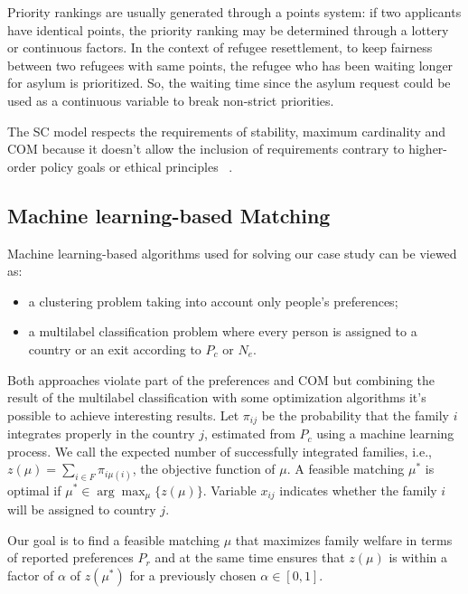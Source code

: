 Priority rankings are usually generated through a points system: if two applicants have identical points, the priority ranking may be determined through a lottery or continuous factors. In the context of refugee resettlement, to keep fairness between two refugees with same points, the refugee who has been waiting longer for asylum is prioritized. So, the waiting time since the asylum request could be used as a continuous variable to break non-strict priorities.

The SC model respects the requirements of stability, maximum cardinality and COM because it doesn't allow the inclusion of requirements contrary to higher-order policy goals or ethical principles ~\cite{basshuysen}.


\subsection{Machine learning-based Matching}\label{machine-learning-based-matching}%

Machine learning-based algorithms used for solving our case study can be viewed as:

\begin{itemize}
    \item a clustering problem taking into account only people's preferences;
    \item a multilabel classification problem where every person is assigned to a country or an exit according to \(P_c\) or \(N_e\).
\end{itemize}
Both approaches violate part of the preferences and COM but combining the result of the multilabel classification with some optimization algorithms it's possible to achieve interesting results. Let \(\pi_{ij}\) be the probability that the family \(i\) integrates properly in the country \(j\), estimated from \(P_c\) using a machine learning process. We call the expected number of successfully integrated families, i.e., \(z (\mu) = \sum_{i \in F} \pi_{i \mu (i)}\), the objective function of \(\mu\). A feasible matching \(\mu^*\) is optimal if \(\mu^* \in \arg\max_{\mu} \{z (\mu)\}\). Variable \(x_{ij}\) indicates whether the family \(i\) will be assigned to country \(j\).

Our goal is to find a feasible matching \(\mu\) that maximizes family welfare in terms of reported preferences \(P_r\) and at the same time ensures that \(z (\mu)\) is within a factor of \(\alpha\) of \(z \left( \mu^* \right)\) for a previously chosen \(\alpha \in [0,1]\).

